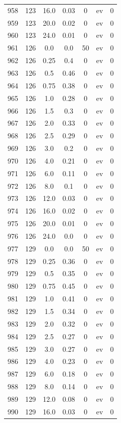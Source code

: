 \documentclass[12pt,a4paper]{article}
\begin{document}
\begin{tabular}{r|cccccc}
	958 & 123 & 16.0 & 0.03 & 0 & ev & 0 \\
	959 & 123 & 20.0 & 0.02 & 0 & ev & 0 \\
	960 & 123 & 24.0 & 0.01 & 0 & ev & 0 \\
	961 & 126 & 0.0 & 0.0 & 50 & ev & 0 \\
	962 & 126 & 0.25 & 0.4 & 0 & ev & 0 \\
	963 & 126 & 0.5 & 0.46 & 0 & ev & 0 \\
	964 & 126 & 0.75 & 0.38 & 0 & ev & 0 \\
	965 & 126 & 1.0 & 0.28 & 0 & ev & 0 \\
	966 & 126 & 1.5 & 0.3 & 0 & ev & 0 \\
	967 & 126 & 2.0 & 0.33 & 0 & ev & 0 \\
	968 & 126 & 2.5 & 0.29 & 0 & ev & 0 \\
	969 & 126 & 3.0 & 0.2 & 0 & ev & 0 \\
	970 & 126 & 4.0 & 0.21 & 0 & ev & 0 \\
	971 & 126 & 6.0 & 0.11 & 0 & ev & 0 \\
	972 & 126 & 8.0 & 0.1 & 0 & ev & 0 \\
	973 & 126 & 12.0 & 0.03 & 0 & ev & 0 \\
	974 & 126 & 16.0 & 0.02 & 0 & ev & 0 \\
	975 & 126 & 20.0 & 0.01 & 0 & ev & 0 \\
	976 & 126 & 24.0 & 0.0 & 0 & ev & 0 \\
	977 & 129 & 0.0 & 0.0 & 50 & ev & 0 \\
	978 & 129 & 0.25 & 0.36 & 0 & ev & 0 \\
	979 & 129 & 0.5 & 0.35 & 0 & ev & 0 \\
	980 & 129 & 0.75 & 0.45 & 0 & ev & 0 \\
	981 & 129 & 1.0 & 0.41 & 0 & ev & 0 \\
	982 & 129 & 1.5 & 0.34 & 0 & ev & 0 \\
	983 & 129 & 2.0 & 0.32 & 0 & ev & 0 \\
	984 & 129 & 2.5 & 0.27 & 0 & ev & 0 \\
	985 & 129 & 3.0 & 0.27 & 0 & ev & 0 \\
	986 & 129 & 4.0 & 0.23 & 0 & ev & 0 \\
	987 & 129 & 6.0 & 0.18 & 0 & ev & 0 \\
	988 & 129 & 8.0 & 0.14 & 0 & ev & 0 \\
	989 & 129 & 12.0 & 0.08 & 0 & ev & 0 \\
	990 & 129 & 16.0 & 0.03 & 0 & ev & 0 \\

\end{tabular}
\end{document}
